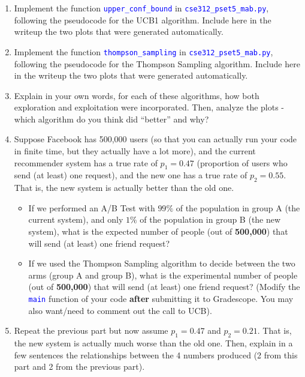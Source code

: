\documentclass[12pt]{article}
\def\code#1{\textcolor{blue}{\texttt{#1}}}
\renewcommand{\|}{\mid}
\begin{document}
\begin{enumerate}
    \begin{enumerate}
        \item Implement the function \code{upper\_conf\_bound} in \code{cse312\_pset5\_mab.py}, following the pseudocode for the UCB1 algorithm. Include here in the writeup the two plots that were generated automatically.
        \item Implement the function \code{thompson\_sampling} in \code{cse312\_pset5\_mab.py}, following the pseudocode for the Thompson Sampling algorithm. Include here in the writeup the two plots that were generated automatically.
        \item Explain in your own words, for each of these algorithms, how both exploration and exploitation were incorporated. Then, analyze the plots - which algorithm do you think did ``better'' and why?
        \item Suppose Facebook has 500,000 users (so that you can actually run your code in finite time, but they actually have a lot more), and the current recommender system has a true rate of $p_1=0.47$ (proportion of users who send (at least) one request), and the new one has a true rate of $p_2=0.55$. That is, the new system is actually better than the old one.
        \begin{itemize}
            \item If we performed an A/B Test with $99\%$ of the population in group A (the current system), and only $1\%$ of the population in group B (the new system), what is the expected number of people (out of \textbf{500,000}) that will send (at least) one friend request?
            \item If we used the Thompson Sampling algorithm to decide between the two arms (group A and group B), what is the experimental number of people (out of \textbf{500,000}) that will send (at least) one friend request? (Modify the \code{main} function of your code \textbf{after} submitting it to Gradescope. You may also want/need to comment out the call to UCB).
        \end{itemize}
        \item Repeat the previous part but now assume $p_1=0.47$ and $p_2=0.21$. That is, the new system is actually much worse than the old one. Then, explain in a few sentences the relationships between the 4 numbers produced (2 from this part and 2 from the previous part).
    \end{enumerate}
    

\end{enumerate}
\end{document}
